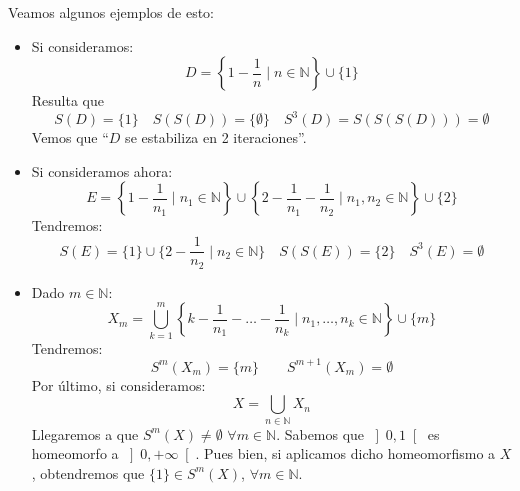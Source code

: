 \begin{ejemplo}
    Veamos algunos ejemplos de esto:
    \begin{itemize}
        \item Si consideramos:
            \begin{equation*}
                D = \left\{1 - \frac{1}{n} \mid n\in \mathbb{N}\right\} \cup \{1\}
            \end{equation*}
            Resulta que
            \begin{equation*}
                S(D) = \{1\} \quad S(S(D)) = \{\emptyset \} \quad S^3(D) = S(S(S(D))) = \emptyset 
            \end{equation*}
            Vemos que ``$D$ se estabiliza en 2 iteraciones''.
        \item Si consideramos ahora:
            \begin{equation*}
                E = \left\{1 - \frac{1}{n_1}\mid n_1\in \mathbb{N}\right\} \cup \left\{2 - \frac{1}{n_1} - \frac{1}{n_2} \mid n_1,n_2\in \mathbb{N}\right\} \cup \{2\}
            \end{equation*}
            Tendremos:
            \begin{equation*}
                S(E) = \{1\} \cup \{2 - \frac{1}{n_2}\mid n_2 \in \mathbb{N}\} \quad 
                S(S(E)) = \{2\} \quad 
                S^3(E) = \emptyset 
            \end{equation*}
        \item Dado $m\in \mathbb{N}$:
            \begin{equation*}
                X_m = \bigcup_{k=1}^m \left\{k - \frac{1}{n_1}- \ldots - \frac{1}{n_k} \mid n_1,\ldots, n_k \in \mathbb{N}\right\} \cup \{m\}
            \end{equation*}
            Tendremos:
            \begin{equation*}
                S^m(X_m) = \{m\} \qquad S^{m+1}(X_m) = \emptyset 
            \end{equation*}
            Por último, si consideramos:
            \begin{equation*}
                X = \bigcup_{n\in \mathbb{N}} X_n
            \end{equation*}
            Llegaremos a que $S^m(X) \neq \emptyset $  $\forall m\in \mathbb{N}$. Sabemos que $\left]0,1\right[$ es homeomorfo a $\left]0,+\infty\right[$. Pues bien, si aplicamos dicho homeomorfismo a $X$, obtendremos que $\{1\} \in S^m(X)$, $\forall m\in \mathbb{N}$.
    \end{itemize}
\end{ejemplo}

